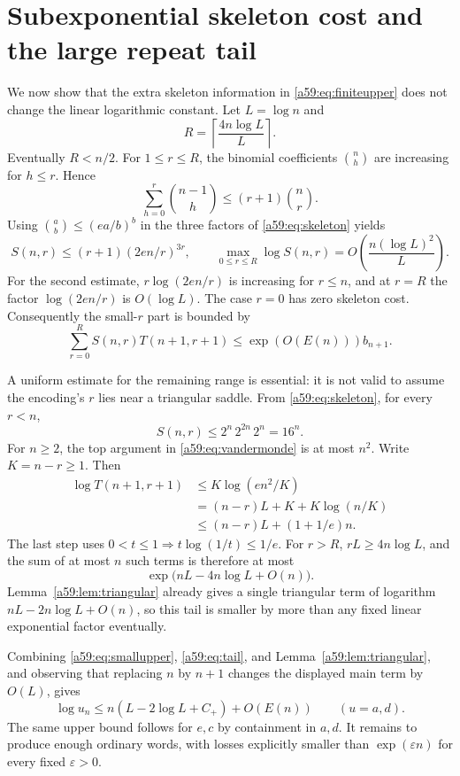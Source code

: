 \documentclass[11pt,letterpaper]{article}
\theoremstyle{remark}\newtheorem{remark}[theorem]{Remark}
\theoremstyle{remark}\newtheorem{wremark}{Remark}\renewcommand{\thewremark}{W\arabic{wremark}}
\theoremstyle{plain}\newtheorem{wcorollary}[wremark]{Corollary}
\begin{document}
\section{Subexponential skeleton cost and the large repeat tail}\label{a59:sec:uppercost}
We now show that the extra skeleton information in \eqref{a59:eq:finiteupper} does not change the linear logarithmic constant. Let $L=\log n$ and
\[
 R=\left\lceil\frac{4n\log L}{L}\right\rceil.
\]
Eventually $R<n/2$. For $1\le r\le R$, the binomial coefficients $\binom nh$ are increasing for $h\le r$. Hence
\[
 \sum_{h=0}^r\binom{n-1}{h}\le(r+1)\binom nr.
\]
Using $\binom ab\le(ea/b)^b$ in the three factors of \eqref{a59:eq:skeleton} yields
\begin{equation}\label{a59:eq:smallS}
 S(n,r)\le(r+1)(2en/r)^{3r},\qquad
 \max_{0\le r\le R}\log S(n,r)=O\!\left(\frac{n(\log L)^2}{L}\right).
\end{equation}
For the second estimate, $r\log(2en/r)$ is increasing for $r\le n$, and at $r=R$ the factor $\log(2en/r)$ is $O(\log L)$. The case $r=0$ has zero skeleton cost. Consequently the small-$r$ part is bounded by
\begin{equation}\label{a59:eq:smallupper}
 \sum_{r=0}^R S(n,r)T(n+1,r+1)
 \le\exp(O(E(n)))b_{n+1}.
\end{equation}

A uniform estimate for the remaining range is essential: it is not valid to assume the encoding's $r$ lies near a triangular saddle. From \eqref{a59:eq:skeleton}, for every $r<n$,
\[
 S(n,r)\le2^n\,2^{2n}\,2^n=16^n.
\]
For $n\ge2$, the top argument in \eqref{a59:eq:vandermonde} is at most $n^2$. Write $K=n-r\ge1$. Then
\begin{align*}
 \log T(n+1,r+1)
 &\le K\log(en^2/K)\\
 &=(n-r)L+K+K\log(n/K)\\
 &\le(n-r)L+(1+1/e)n.
\end{align*}
The last step uses $0<t\le1\Rightarrow t\log(1/t)\le1/e$. For $r>R$, $rL\ge4n\log L$, and the sum of at most $n$ such terms is therefore at most
\begin{equation}\label{a59:eq:tail}
 \exp\bigl(nL-4n\log L+O(n)\bigr).
\end{equation}
Lemma~\ref{a59:lem:triangular} already gives a single triangular term of logarithm $nL-2n\log L+O(n)$, so this tail is smaller by more than any fixed linear exponential factor eventually.

Combining \eqref{a59:eq:smallupper}, \eqref{a59:eq:tail}, and Lemma~\ref{a59:lem:triangular}, and observing that replacing $n$ by $n+1$ changes the displayed main term by $O(L)$, gives
\begin{equation}\label{a59:eq:upperfinal}
 \log u_n\le n(L-2\log L+C_+)+O(E(n))
 \qquad(u=a,d).
\end{equation}
The same upper bound follows for $e,c$ by containment in $a,d$. It remains to produce enough ordinary words, with losses explicitly smaller than $\exp(\varepsilon n)$ for every fixed $\varepsilon>0$.
\end{document}
